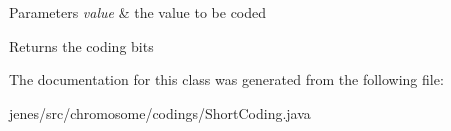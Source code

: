 \begin{DoxyParams}{Parameters}
{\em value} & the value to be coded \\
\hline
\end{DoxyParams}
\begin{DoxyReturn}{Returns}
the coding bits 
\end{DoxyReturn}


The documentation for this class was generated from the following file\-:\begin{DoxyCompactItemize}
\item 
jenes/src/chromosome/codings/Short\-Coding.\-java\end{DoxyCompactItemize}
